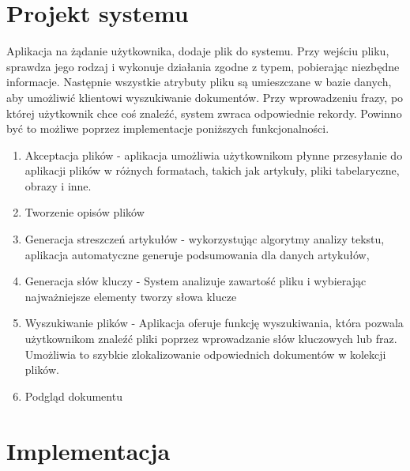 \documentclass[12pt,a4paper,twoside]{article}
\begin{document}
\section{Projekt systemu}
Aplikacja na żądanie użytkownika, dodaje plik do systemu. Przy wejściu pliku, sprawdza jego rodzaj i wykonuje działania zgodne z typem, pobierając niezbędne informacje. Następnie wszystkie atrybuty pliku są umieszczane w bazie danych, aby umożliwić klientowi wyszukiwanie dokumentów. Przy wprowadzeniu frazy, po której użytkownik chce coś znaleźć, system zwraca odpowiednie rekordy. Powinno być to możliwe poprzez implementacje poniższych funkcjonalności.
\begin{enumerate}
	 \item Akceptacja plików - aplikacja umożliwia użytkownikom płynne przesyłanie do aplikacji plików w różnych formatach, takich jak artykuły, pliki tabelaryczne, obrazy i inne.
	 \item Tworzenie opisów plików
	 \item Generacja streszczeń artykułów - wykorzystując algorytmy analizy tekstu, aplikacja automatyczne generuje podsumowania dla danych artykułów,
	 \item Generacja słów kluczy - System analizuje zawartość pliku i wybierając najważniejsze elementy tworzy słowa klucze
	 \item Wyszukiwanie plików - Aplikacja oferuje funkcję wyszukiwania, która pozwala użytkownikom znaleźć pliki poprzez wprowadzanie słów kluczowych lub fraz. Umożliwia to szybkie zlokalizowanie odpowiednich dokumentów w kolekcji plików.
	 \item Podgląd dokumentu
\end{enumerate}
\section{Implementacja}
\end{document}
